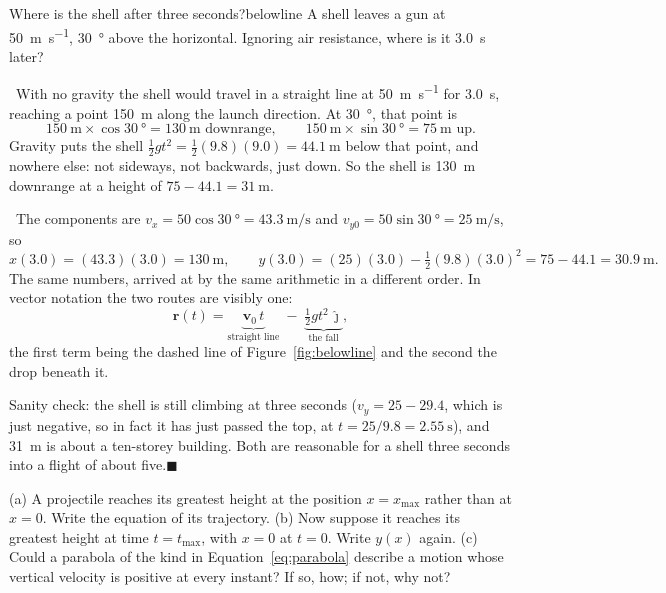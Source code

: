 \documentclass[11pt,twoside,openany]{book}
\newcounter{check}[chapter]
\newcommand{\viewtag}[3]{\fcolorbox{#2}{#3}{\footnotesize\textbf{\textcolor{#2}{#1}}}}
\newcommand{\elemtag}{\viewtag{Elementary}{elemcol}{elempale}}
\newcommand{\calctag}{\viewtag{Calculus}{calccol}{calcpale}}
\newcommand{\elem}{\par\medskip\noindent\elemtag\ }
\newcommand{\calc}{\par\medskip\noindent\calctag\ }
\newcommand{\qed}{\hfill$\blacksquare$}
\begin{document}
\begin{example}{Where is the shell after three seconds?}{belowline}
A shell leaves a gun at \SI{50}{\metre\per\second}, \SI{30}{\degree} above the horizontal. Ignoring air resistance, where is it \SI{3.0}{\second} later?

\elem With no gravity the shell would travel in a straight line at \SI{50}{\metre\per\second} for \SI{3.0}{\second}, reaching a point \SI{150}{\metre} along the launch direction. At \SI{30}{\degree}, that point is
\[
\SI{150}{\metre}\times\cos\SI{30}{\degree} = \SI{130}{\metre} \text{ downrange}, \qquad
\SI{150}{\metre}\times\sin\SI{30}{\degree} = \SI{75}{\metre} \text{ up}.
\]
Gravity puts the shell $\tfrac12 g t^2 = \tfrac12(9.8)(9.0) = \SI{44.1}{\metre}$ below that point, and nowhere else: not sideways, not backwards, just down. So the shell is \SI{130}{\metre} downrange at a height of $75 - 44.1 = \SI{31}{\metre}$.

\calc The components are $v_x = 50\cos\SI{30}{\degree} = \SI{43.3}{\metre\per\second}$ and $v_{y0} = 50\sin\SI{30}{\degree} = \SI{25}{\metre\per\second}$, so
\[
x(3.0) = (43.3)(3.0) = \SI{130}{\metre}, \qquad
y(3.0) = (25)(3.0) - \tfrac12(9.8)(3.0)^2 = 75 - 44.1 = \SI{30.9}{\metre}.
\]
The same numbers, arrived at by the same arithmetic in a different order. In vector notation the two routes are visibly one:
\[
\mathbf{r}(t) = \underbrace{\mathbf{v}_0\,t}_{\text{straight line}} \; - \; \underbrace{\tfrac12 g t^2\,\hat{\mathbf{\jmath}}}_{\text{the fall}},
\]
the first term being the dashed line of Figure~\ref{fig:belowline} and the second the drop beneath it.

Sanity check: the shell is still climbing at three seconds ($v_y = 25 - 29.4$, which is just negative, so in fact it has just passed the top, at $t = 25/9.8 = \SI{2.55}{\second}$), and \SI{31}{\metre} is about a ten-storey building. Both are reasonable for a shell three seconds into a flight of about five.\qed
\end{example}

\begin{checkbox}
(a) A projectile reaches its greatest height at the position $x = x_{\max}$ rather than at $x = 0$. Write the equation of its trajectory. (b) Now suppose it reaches its greatest height at time $t = t_{\max}$, with $x = 0$ at $t = 0$. Write $y(x)$ again. (c) Could a parabola of the kind in Equation~\eqref{eq:parabola} describe a motion whose vertical velocity is positive at every instant? If so, how; if not, why not?
\end{checkbox}
\end{document}
